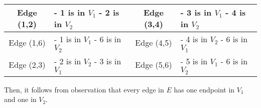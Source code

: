 \documentclass[12pt]{article}
\begin{document}
\begin{enumerate}[a.]
\begin{mdframed}
\begin{enumerate}[1.]
\begin{mdframed}
            \begin{tabular}{|c|p{3cm}|c|p{3cm}|}
                \hline
                Edge (1,2) & - 1 is in $V_1$ \newline - 2 is in $V_2$ & Edge (3,4) & - 3 is in $V_1$ \newline - 4 is in $V_2$\\
                \hline
                Edge (1,6) & - 1 is in $V_1$ \newline - 6 is in $V_2$ & Edge (4,5) & - 4 is in $V_2$ \newline - 6 is in $V_1$\\
                \hline
                Edge (2,3) & - 2 is in $V_2$ \newline - 3 is in $V_1$ & Edge (5,6) & - 5 is in $V_1$ \newline - 6 is in $V_2$\\
                \hline
            \end{tabular}

            \bigskip

            Then, it follows from observation that every edge in $E$ has
            one endpoint in $V_1$ and one in $V_2$.

            \end{mdframed}

        \end{enumerate}

    \end{mdframed}
\end{enumerate}
\end{document}
